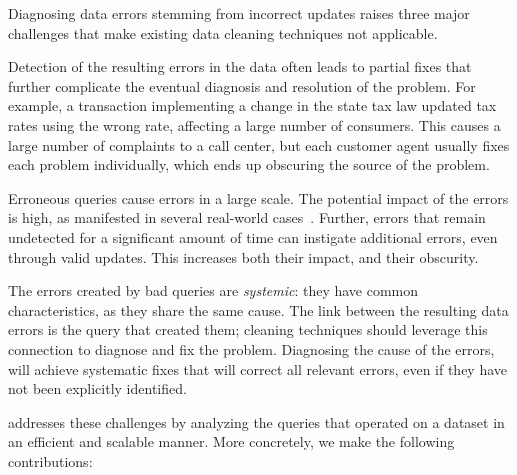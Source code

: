 


Diagnosing data errors stemming from incorrect updates raises three major
challenges that make existing data cleaning techniques not applicable.



\begin{description}[leftmargin=*, topsep=0mm, itemsep=0mm]
    
    \item[Obscurity.] Detection of the resulting errors in the data often
    leads to partial fixes that further complicate the eventual diagnosis and
    resolution of the problem. For example, a transaction implementing a
    change in the state tax law updated tax rates using the wrong rate,
    affecting a large number of consumers. This causes a large number of
    complaints to a call center, but each customer agent usually fixes each
    problem individually, which ends up obscuring the source of the problem.
    
    \item[Large impact.] Erroneous queries cause errors in a large scale. The
    potential impact of the errors is high, as manifested in several
    real-world cases~\cite{Yates10, Grady13, sakalerrors}. Further, errors
    that remain undetected for a significant amount of time can instigate
    additional errors, even through valid updates. This increases both their
    impact, and their obscurity.
    
    \item[Systemic errors.] The errors created by bad queries are
    \emph{systemic}: they have common characteristics, as they share the same
    cause. The link between the resulting data errors is the query that
    created them; cleaning techniques should leverage this connection to
    diagnose and fix the problem. Diagnosing the cause of the errors, will
    achieve systematic fixes that will correct all relevant errors, even if
    they have not been explicitly identified.
    
\end{description}
% 
\sys addresses these challenges by analyzing the queries that operated on a
dataset in an efficient and scalable manner. More concretely, we make the
following contributions:


